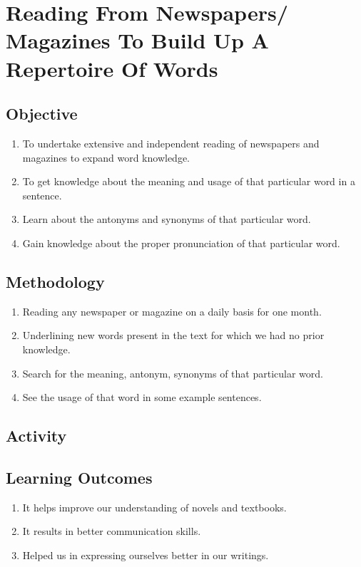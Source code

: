 \section{Reading From Newspapers/ Magazines To Build Up A Repertoire Of Words}

\subsection{Objective}
\begin{enumerate}
    \item To undertake extensive and independent reading of newspapers and magazines to
          expand word knowledge.
    \item To get knowledge about the meaning and usage of that particular word in a sentence.
    \item Learn about the antonyms and synonyms of that particular word.
    \item Gain knowledge about the proper pronunciation of that particular word.
\end{enumerate}

\subsection{Methodology}
\begin{enumerate}
    \item Reading any newspaper or magazine on a daily basis for one month.
    \item Underlining new words present in the text for which we had no prior knowledge.
    \item Search for the meaning, antonym, synonyms of that particular word.
    \item See the usage of that word in some example sentences.
\end{enumerate}

\subsection{Activity}

\subsection{Learning Outcomes}
\begin{enumerate}
    \item It helps improve our understanding of novels and textbooks.
    \item It results in better communication skills.
    \item Helped us in expressing ourselves better in our writings.
\end{enumerate}

